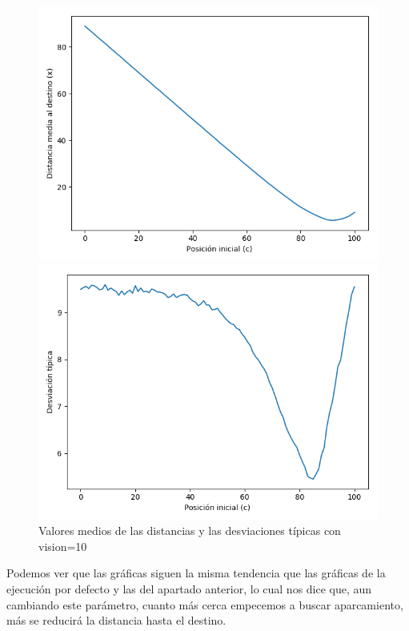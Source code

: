 \documentclass[11pt,a4paper]{report}
\begin{document}
\begin{figure}[H]
	\begin{minipage}{0.5\textwidth}
	  \centering
	  \includegraphics[scale=0.4]{img/x-100-10-90.png}
	\end{minipage}
	\begin{minipage}{0.5\textwidth}
	  \centering
	  \includegraphics[scale=0.4]{img/dt-100-10-90.png}
	\end{minipage}
	\caption{Valores medios de las distancias y las desviaciones típicas con vision=10}
\end{figure}

Podemos ver que las gráficas siguen la misma tendencia que las gráficas de la ejecución por defecto y las del apartado anterior,
lo cual nos dice que, aun cambiando este parámetro, cuanto más cerca empecemos a buscar aparcamiento, más se reducirá la distancia
hasta el destino.
\end{document}

